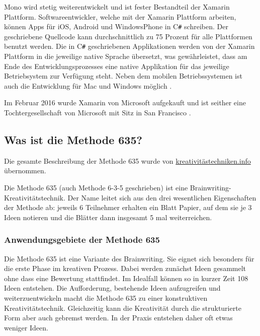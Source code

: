 Mono wird stetig weiterentwickelt und ist fester Bestandteil der Xamarin Plattform. Softwareentwickler, welche mit der Xamarin Plattform arbeiten, können Apps für iOS, Android und WindowsPhone in C\texttt{\#} schreiben. Der geschriebene Quellcode kann durchschnittlich zu 75 Prozent für alle Plattformen benutzt werden. Die in C\texttt{\#} geschriebenen Applikationen werden von der Xamarin Plattform in die jeweilige native Sprache übersetzt, was gewährleistet, dass am Ende des Entwicklungsprozesses eine native Applikation für das jeweilige Betriebsystem zur Verfügung steht. Neben dem mobilen Betriebssystemen ist auch die Entwicklung für Mac und Windows möglich \cite{XamarinCCVossel}.

Im Februar 2016 wurde Xamarin von Microsoft aufgekauft und ist seither eine Tochtergesellschaft von Microsoft mit Sitz in San Francisco \cite{XamarinWikipedia}.


\subsection{Was ist die Methode 635?} \label{subsec:methode_635_desc}
Die gesamte Beschreibung der Methode 635 wurde von \href{https://kreativitätstechniken.info/6-3-5-methode/}{kreativitästechniken.info} \cite{methode-635} übernommen. 


Die Methode 635 (auch Methode 6-3-5 geschrieben) ist eine Brainwriting-Kre\-ati\-vi\-täts\-technik. Der Name leitet sich aus den drei wesentlichen Eigenschaften der Methode ab: jeweils 6 Teilnehmer erhalten ein Blatt Papier, auf dem sie je 3 Ideen notieren und die Blätter dann insgesamt 5 mal weiterreichen.

\subsubsection*{Anwendungsgebiete der Methode 635}
Die Methode 635 ist eine Variante des Brainwriting. Sie eignet sich besonders für die erste Phase im kreativen Prozess. Dabei werden zunächst Ideen gesammelt ohne dass eine Bewertung stattfindet. Im Idealfall können so in kurzer Zeit 108 Ideen entstehen. Die Aufforderung, bestehende Ideen aufzugreifen und weiterzuentwickeln macht die Methode 635 zu einer konstruktiven Kreativitätstechnik. Gleichzeitig kann die Kreativität durch die strukturierte Form aber auch gebremst werden. In der Praxis entstehen daher oft etwas weniger Ideen.

